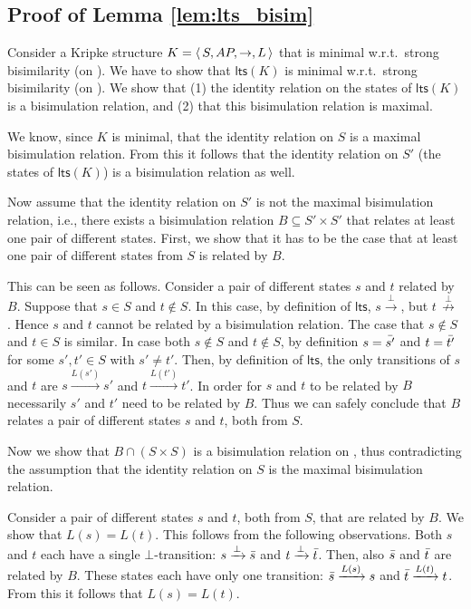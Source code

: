 \documentclass{llncs}
\newcommand{\ltsntrans}[1]{\,{\stackrel{{#1}}{\nrightarrow}}\,}
\newcommand{\ltstrans}[1]{\xrightarrow{#1}}
\newcommand{\kstrans}{\to}
\newcommand{\lts}{\mathsf{lts}}
\begin{document}
\subsection{Proof of Lemma \ref{lem:lts_bisim}}
\label{pf:lem:lts_bisim}

Consider a Kripke structure $K = \tuple{S,AP,\kstrans,L}$ that is minimal w.r.t.\ strong bisimilarity (on \KS). We have to show that $\lts(K)$ is minimal w.r.t.\ strong bisimilarity (on \LTS). We show that (1) the identity relation on the states of $\lts(K)$ is a bisimulation relation, and (2) that this bisimulation relation is maximal.

We know, since $K$ is minimal, that the identity relation on $S$ is a maximal bisimulation relation. From this it follows that the identity relation on $S'$ (the states of $\lts(K)$) is a bisimulation relation as well.

Now assume that the identity relation on $S'$ is not the maximal bisimulation relation, i.e.,  there exists a bisimulation relation $B \subseteq S'\times S'$ that relates at least one pair of different states. First, we show that it has to be the case that at least one pair of different states from $S$ is related by $B$.

This can be seen as follows. Consider a pair of different states $s$ and $t$ related by $B$. Suppose that $s \in S$ and $t \not\in S$. In this case, by definition of $\lts$, $s \ltstrans{\bot}$, but $t \ltsntrans{\bot}$. Hence $s$ and $t$ cannot be related by a bisimulation relation. The case that $s\not\in S$ and $t \in S$ is similar.
In case both $s \not\in S$ and $t \not\in S$, by definition $s = \bar{s'}$ and $t = \bar{t'}$ for some $s',t'\in S$ with $s'\neq t'$. Then, by definition of $\lts$, the only transitions of $s$ and $t$ are $s \ltstrans{L(s')} s'$ and $t \ltstrans{L(t')} t'$. In order for $s$ and $t$ to be related by $B$ necessarily $s'$ and $t'$ need to be related by $B$. Thus we can safely conclude that $B$ relates a pair of different states $s$ and $t$, both from $S$.

Now we show that $B \cap (S \times S)$ is a bisimulation relation on \KS, thus contradicting the assumption that the identity relation on $S$ is the maximal bisimulation relation.

Consider a pair of different states $s$ and $t$, both from $S$, that are related by $B$. We show that $L(s) = L(t)$.
 This follows from the following observations. Both $s$ and $t$ each have a single $\bot$-transition: $s \ltstrans{\bot} \shadow{s}$ and $t \ltstrans{\bot} \shadow{t}$. Then, also $\bar{s}$ and $\bar{t}$ are related by $B$. These states each have only one transition: $\shadow{s} \ltstrans{L(s)} s$ and $\shadow{t} \ltstrans{L(t)} t$. From this it follows that $L(s) =L(t)$.
\end{document}
